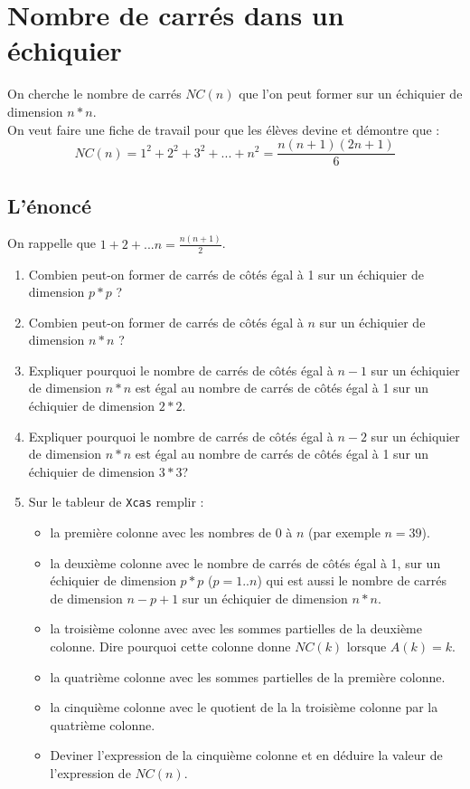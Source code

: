 \documentclass[a4paper,11pt]{book}
\begin{document}
\section{Nombre de carr\'es dans un \'echiquier}
On cherche le nombre de carr\'es $NC(n)$ que l'on peut former sur un \'echiquier
de dimension $n*n$.\\
On veut faire une fiche de travail pour que les \'el\`eves devine et d\'emontre
que :\\
$$NC(n)=1^2+2^2+3^2+...+n^2=\frac{n(n+1)(2n+1)}{6}$$
\subsection{L'\'enonc\'e}
On rappelle que $1+2+...n=\frac{n(n+1)}{2}$.
\begin{enumerate}
\item Combien peut-on former de carr\'es de c\^ot\'es \'egal \`a 1 sur un 
\'echiquier de dimension $p*p$ ?
\item Combien peut-on former de carr\'es de c\^ot\'es \'egal \`a $n$ sur un 
\'echiquier de dimension $n*n$ ?
\item Expliquer pourquoi le nombre de carr\'es de c\^ot\'es \'egal \`a $n-1$ 
sur un \'echiquier de dimension $n*n$ est \'egal au nombre de carr\'es de 
c\^ot\'es \'egal \`a 1 sur un \'echiquier de dimension $2*2$.
\item  Expliquer pourquoi le nombre de carr\'es de c\^ot\'es \'egal \`a $n-2$ 
sur un \'echiquier de dimension $n*n$ est \'egal au nombre de carr\'es de 
c\^ot\'es \'egal \`a 1 sur un \'echiquier de dimension $3*3$?
\item Sur le tableur de {\tt Xcas} remplir :
\begin{itemize}
\item la premi\`ere colonne avec les nombres de 0 \`a $n$ (par exemple $n=39$).
\item la deuxi\`eme colonne avec le nombre de carr\'es de c\^ot\'es \'egal \`a 
1, sur un \'echiquier de dimension $p*p$ ($p=1..n$) qui est aussi le nombre de 
carr\'es de dimension $n-p+1$ sur un \'echiquier de dimension $n*n$.
\item la troisi\`eme colonne avec avec les sommes partielles de la deuxi\`eme 
colonne. Dire pourquoi cette colonne donne $NC(k)$ lorsque $A(k)=k$.
\item la quatri\`eme colonne avec les sommes partielles de la premi\`ere 
colonne.
\item la cinqui\`eme colonne  avec le quotient de la  la troisi\`eme colonne
par la  quatri\`eme colonne.
\item Deviner l'expression de la cinqui\`eme colonne et en d\'eduire 
la valeur de l'expression de $NC(n)$.
\end{itemize}
\end{enumerate}
\end{document}
